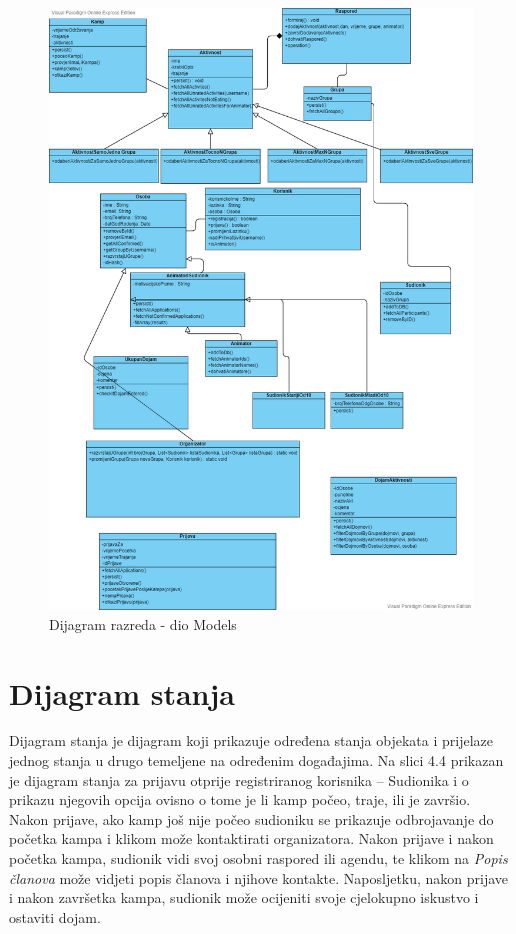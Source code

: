 \begin{figure}[htpb]
	\centering
	\includegraphics[scale=0.3]{dijagrami/UMLdiagram.PNG}
	\caption{Dijagram razreda - dio Models}
	\label{fig: dijagram razreda models}
\end{figure}
\eject

		\eject
		\newpage
		
		\section{Dijagram stanja}
			
			
Dijagram stanja je dijagram koji prikazuje određena stanja objekata i prijelaze jednog stanja u drugo temeljene na određenim događajima. Na slici 4.4 prikazan je dijagram stanja za prijavu otprije registriranog korisnika – Sudionika i o prikazu njegovih opcija ovisno o tome je li kamp počeo, traje, ili je završio. Nakon prijave, ako kamp još nije počeo sudioniku se prikazuje odbrojavanje do početka kampa i klikom može kontaktirati organizatora. Nakon prijave i nakon početka kampa, sudionik vidi svoj osobni raspored ili agendu, te klikom na \textit{Popis članova} može vidjeti popis članova i njihove kontakte. Naposljetku, nakon prijave i nakon završetka kampa, sudionik može ocijeniti svoje cjelokupno iskustvo i ostaviti dojam.
			
